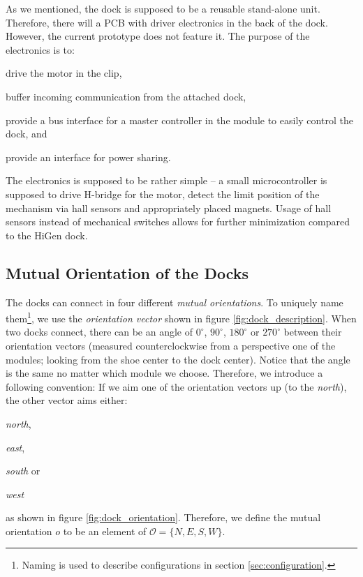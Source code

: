 As we mentioned, the dock is supposed to be a reusable stand-alone unit.
Therefore, there will a PCB with driver electronics in the back of the dock.
However, the current prototype does not feature it. The purpose of the
electronics is to:
\begin{enumerate*}
    \item drive the motor in the clip,
    \item buffer incoming communication from the attached dock,
    \item provide a bus interface for a master controller in the module to
    easily control the dock, and
    \item provide an interface for power sharing.
\end{enumerate*}
The electronics is supposed to be rather simple -- a small microcontroller is
supposed to drive H-bridge for the motor, detect the limit position of the
mechanism via hall sensors and appropriately placed magnets. Usage of hall
sensors instead of mechanical switches allows for further minimization compared
to the HiGen dock.

\subsection{Mutual Orientation of the Docks}\label{sec:mutual_orientation}

The docks can connect in four different \emph{mutual orientations}. To uniquely
name them\footnote{Naming is used to describe configurations in section
\ref{sec:configuration}.}, we use the \emph{orientation vector} shown in figure
\ref{fig:dock_description}. When two docks connect, there can be an angle of
$0^\circ$, $90^\circ$, $180^\circ$ or $270^\circ$ between their orientation
vectors (measured counterclockwise from a perspective one of the modules;
looking from the shoe center to the dock center). Notice that the angle is the
same no matter which module we choose. Therefore, we introduce a following
convention: If we aim one of the orientation vectors up (to the \emph{north}),
the other vector aims either:
\begin{enumerate*}
    \item \emph{north},
    \item \emph{east},
    \item \emph{south} or
    \item \emph{west}
\end{enumerate*}
as shown in figure \ref{fig:dock_orientation}. Therefore, we define the mutual
orientation $o$ to be an element of $\mathcal{O} = \{N, E, S, W\}$.

